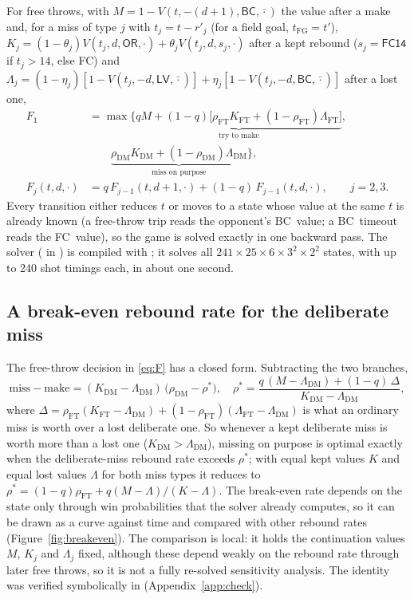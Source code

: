 \documentclass[article]{jdssv}
\newcommand{\BC}{\textsf{BC}}
\newcommand{\FC}{\textsf{FC}}
\newcommand{\LV}{\textsf{LV}}
\newcommand{\OR}{\textsf{OR}}
\begin{document}
For free throws, with $M=1-V(t,-(d+1),\BC,\bar\cdot)$ the value after a make and, for a miss of type $j$ with
$t_j=t-r'_j$ (for a field goal, $t_{\mathrm{FG}}=t'$), $K_j=(1-\theta_j)V(t_j,d,\OR,\cdot)+\theta_jV(t_j,d,s_j,\cdot)$ after a kept rebound ($s_j=\textsf{FC14}$ if
$t_j>14$, else \FC) and $\Lambda_j=(1-\eta_j)[1-V(t_j,-d,\LV,\bar\cdot)]+\eta_j[1-V(t_j,-d,\BC,\bar\cdot)]$ after a lost one,
\begin{align}
F_1 &= \max\big\{\underbrace{qM+(1-q)\big[\rho_{\mathrm{FT}}K_{\mathrm{FT}}+(1-\rho_{\mathrm{FT}})\Lambda_{\mathrm{FT}}\big]}_{\text{try to make}},\nonumber\\
&\qquad \underbrace{\rho_{\mathrm{DM}}K_{\mathrm{DM}}+(1-\rho_{\mathrm{DM}})\Lambda_{\mathrm{DM}}}_{\text{miss on purpose}}\big\}, \label{eq:F}\\
F_j(t,d,\cdot) &= q\,F_{j-1}(t,d+1,\cdot)+(1-q)\,F_{j-1}(t,d,\cdot),\qquad j=2,3.\nonumber
\end{align}
Every transition either reduces $t$ or moves to a state whose value at the same $t$ is already known
(a free-throw trip reads the opponent's \BC\ value; a \BC\ timeout reads the \FC\ value), so the game is
solved exactly in one backward pass. The solver ( in ) is compiled with
 \citep{numba}; it solves all $241\times 25\times 6\times 3^2\times 2^2$ states, with up to 240
shot timings each, in about one second.

\subsection{A break-even rebound rate for the deliberate miss}

The free-throw decision in \eqref{eq:F} has a closed form. Subtracting the two branches,
\begin{equation}
\text{miss} - \text{make} = (K_{\mathrm{DM}}-\Lambda_{\mathrm{DM}})\,\big(\rho_{\mathrm{DM}}-\rho^{\ast}\big),\quad
\rho^{\ast}=\frac{q\,(M-\Lambda_{\mathrm{DM}})+(1-q)\,\Delta}{K_{\mathrm{DM}}-\Lambda_{\mathrm{DM}}}, \label{eq:rstar}
\end{equation}
where $\Delta=\rho_{\mathrm{FT}}(K_{\mathrm{FT}}-\Lambda_{\mathrm{DM}})+(1-\rho_{\mathrm{FT}})(\Lambda_{\mathrm{FT}}-\Lambda_{\mathrm{DM}})$ is
what an ordinary miss is worth over a lost deliberate one. So whenever a kept deliberate miss is worth more than a lost one ($K_{\mathrm{DM}}>\Lambda_{\mathrm{DM}}$), missing on purpose is
optimal exactly when the deliberate-miss rebound rate exceeds $\rho^{\ast}$; with equal kept values $K$ and equal lost
values $\Lambda$ for both miss types it reduces to $\rho^{\ast}=(1-q)\rho_{\mathrm{FT}}+q(M-\Lambda)/(K-\Lambda)$. The break-even rate depends on
the state only through win probabilities that the solver already computes, so it can be drawn as a
curve against time and compared with other rebound rates (Figure~\ref{fig:breakeven}). The comparison is local:
it holds the continuation values $M$, $K_j$ and $\Lambda_j$ fixed, although these depend weakly on the rebound rate
through later free throws, so it is not a fully re-solved sensitivity analysis. The
identity was verified symbolically in  \citep{mathematica} (Appendix~\ref{app:check}).
\end{document}
